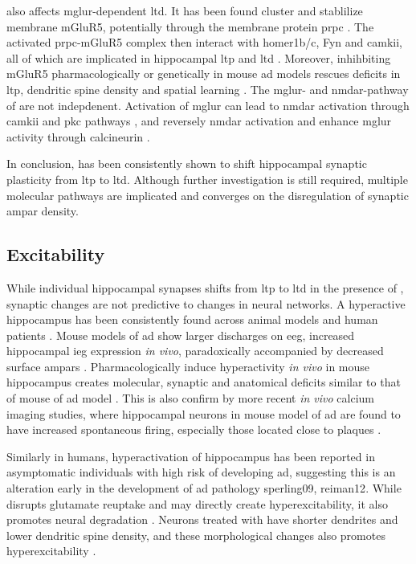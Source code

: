 \abeta{} also affects \gls{mglur}-dependent \gls{ltd}. It has been found \abeta{} cluster and stablilize membrane mGluR5, potentially through the membrane protein \gls{prpc} \citep{renner10, um13}. The activated \gls{prpc}-mGluR5 complex then interact with homer1b/c, Fyn and \gls{camkii}, all of which are implicated in hippocampal \gls{ltp} and \gls{ltd} \citep{raka15, haas16}. Moreover, inhihbiting mGluR5 pharmacologically or genetically in mouse \gls{ad} models rescues deficits in \gls{ltp}, dendritic spine density and spatial learning \citep{rammes11, hu14, um13, hamilton14}. The \gls{mglur}- and \gls{nmdar}-pathway of \abeta{} are not indepdenent. Activation of \gls{mglur} can lead to \gls{nmdar} activation through \gls{camkii} and \gls{pkc} pathways \citep{chen11, jin15}, and reversely \gls{nmdar} activation and enhance \gls{mglur} activity through calcineurin \citep{alagarsamy99, alagarsamy05}. 

In conclusion, \abeta{} has been consistently shown to shift hippocampal synaptic plasticity from \gls{ltp} to \gls{ltd}. Although further investigation is still required, multiple molecular pathways are implicated and converges on the disregulation of synaptic \gls{ampar} density. 


\subsection{Excitability}

While individual hippocampal synapses shifts from \gls{ltp} to \gls{ltd} in the presence of \abeta, synaptic changes are not predictive to changes in neural networks. A hyperactive hippocampus has been consistently found across animal models and human patients \citep{palop16}. Mouse models of \gls{ad} show larger discharges on \gls{eeg}, increased hippocampal \gls{ieg} expression \textit{in vivo}, paradoxically accompanied by decreased surface \glspl{ampar} \citep{palop07, harris10, born14}. Pharmacologically induce hyperactivity \textit{in vivo} in mouse hippocampus creates molecular, synaptic and anatomical deficits similar to that of mouse of \gls{ad} model \citep{palop07}. This is also confirm by more recent \textit{in vivo} calcium imaging studies, where hippocampal neurons in mouse model of \gls{ad} are found to have increased spontaneous firing, especially those located close to plaques \citep{busche12}. 

Similarly in humans, hyperactivation of hippocampus has been reported in asymptomatic individuals with high risk of developing \gls{ad}, suggesting this is an alteration early in the development of \gls{ad} pathology {sperling09, reiman12}. While \abeta{} disrupts glutamate reuptake and may directly create hyperexcitability, it also promotes neural degradation \citep{spires04, koffie09}. Neurons treated with \abeta{} have shorter dendrites and lower dendritic spine density, and these morphological changes also promotes hyperexcitability \citep{siskova14}.

